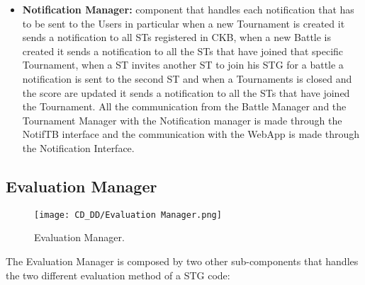 \begin{itemize}
    \item \textbf{Notification Manager:} component that handles each notification that has to be sent to the Users in particular when a new Tournament is created it sends a notification to all STs registered in CKB, when a new Battle is created it sends a notification to all the STs that have joined that specific Tournament, when a ST invites another ST to join his STG for a battle a notification is sent to the second ST and when a Tournaments is closed and the score are updated it sends a notification to all the STs that have joined the Tournament. All the communication from the Battle Manager and the Tournament Manager with the Notification manager is made through the NotifTB interface and the communication with the WebApp is made through the Notification Interface.
\end{itemize}

\subsection{Evaluation Manager}
\label{subsec:evaluation_manager}%

\begin{figure}[H]
    \begin{center}
        \texttt{[image: CD\_DD/Evaluation Manager.png]}
        \caption{Evaluation Manager.}
        \label{fig:evaluation_manager}%
    \end{center}
\end{figure}

\noindent The Evaluation Manager is composed by two other sub-components that handles the two different evaluation method of a STG code:

